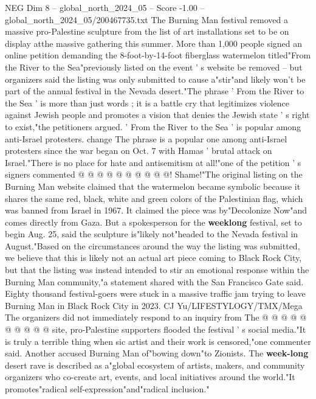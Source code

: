 \begin{textsample}{NEG Dim 8 – global\_north\_2024\_05 – Score -1.00 – global\_north\_2024\_05/200467735.txt}  \label{ex:f8_neg_270}
The Burning Man festival removed a massive pro-Palestine sculpture from the list of art installations set to be on display atthe massive gathering this summer.
More than 1,000 people signed an online petition demanding the 8-foot-by-14-foot fiberglass watermelon titled"From the River to the Sea"previously listed on the event ' s website be removed -- but organizers said the listing was only submitted to cause a"stir"and likely won't be part of the annual festival in the Nevada desert."The phrase ' From the River to the Sea ' is more than just words ; it is a battle cry that legitimizes violence against Jewish people and promotes a vision that denies the Jewish state ' s right to exist,"the petitioners argued. ' From the River to the Sea ' is popular among anti-Israel protesters. change The phrase is a popular one among anti-Israel protesters since the war began on Oct. 7 with Hamas ' brutal attack on Israel."There is no place for hate and antisemitism at all!"one of the petition ' s signers commented @ @ @ @ @ @ @ @ @ @!
Shame!"The original listing on the Burning Man website claimed that the watermelon became symbolic because it shares the same red, black, white and green colors of the Palestinian flag, which was banned from Israel in 1967.
It claimed the piece was by"Decolonize Now"and comes directly from Gaza.
But a spokesperson for the \textbf{weeklong} festival, set to begin Aug. 25, said the sculpture is"likely not"headed to the Nevada festival in August."Based on the circumstances around the way the listing was submitted, we believe that this is likely not an actual art piece coming to Black Rock City, but that the listing was instead intended to stir an emotional response within the Burning Man community,"a statement shared with the San Francisco Gate said.
Eighty thousand festival-goers were stuck in a massive traffic jam trying to leave Burning Man in Black Rock City in 2023.
CJ Yu/LIFESTYLOGY/TMX/Mega The organizers did not immediately respond to an inquiry from The @ @ @ @ @ @ @ @ @ @ site, pro-Palestine supporters flooded the festival ' s social media."It is truly a terrible thing when sic artist and their work is censored,"one commenter said.
Another accused Burning Man of"bowing down"to Zionists.
The \textbf{week-long} desert rave is described as a"global ecosystem of artists, makers, and community organizers who co-create art, events, and local initiatives around the world."It promotes"radical self-expression"and"radical inclusion."

\end{textsample}
